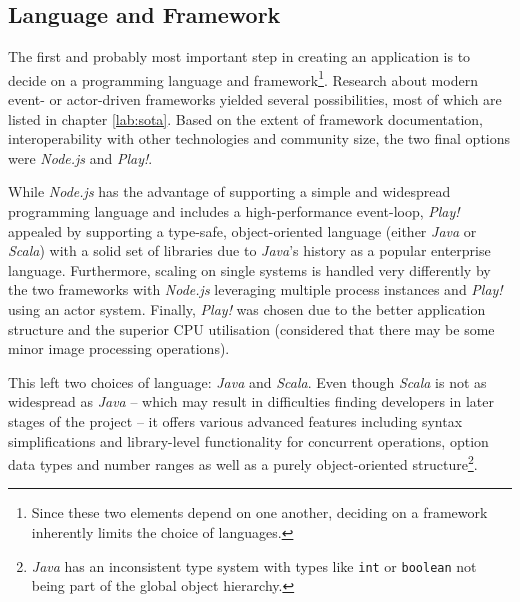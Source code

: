\subsection{Language and Framework}
\label{lab:lang}
The first and probably most important step in creating an application is to decide on a programming language and framework\footnote{Since these two elements depend on one another, deciding on a framework inherently limits the choice of languages.}. Research about modern event- or actor-driven frameworks yielded several possibilities, most of which are listed in chapter \ref{lab:sota}. Based on the extent of framework documentation, interoperability with other technologies and community size, the two final options were \textit{Node.js} and \textit{Play!}. 

While \textit{Node.js} has the advantage of supporting a simple and widespread programming language and includes a high-performance event-loop, \textit{Play!} appealed by supporting a type-safe, object-oriented language (either \textit{Java} or \textit{Scala}) with a solid set of libraries due to \textit{Java}'s history as a popular enterprise language. Furthermore, scaling on single systems is handled very differently by the two frameworks with \textit{Node.js} leveraging multiple process instances and \textit{Play!} using an actor system. Finally, \textit{Play!} was chosen due to the better application structure and the superior CPU utilisation (considered that there may be some minor image processing operations).

This left two choices of language: \textit{Java} and \textit{Scala}. Even though \textit{Scala} is not as widespread as \textit{Java} -- which may result in difficulties finding developers in later stages of the project -- it offers various advanced features including syntax simplifications and library-level functionality for concurrent operations, option data types and number ranges as well as a purely object-oriented structure\footnote{\textit{Java} has an inconsistent type system with types like \texttt{int} or \texttt{boolean} not being part of the global object hierarchy.}. 

